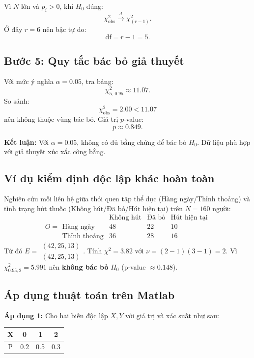 Vì $N$ lớn và $p_i > 0$, khi $H_0$ đúng:
\[
\chi^2_{\mathrm{obs}} \overset{d}{\longrightarrow} \chi^2_{(r-1)}.
\]
Ở đây $r = 6$ nên bậc tự do:
\[
\mathrm{df} = r - 1 = 5.
\]

\subsection*{Bước 5: Quy tắc bác bỏ giả thuyết}

Với mức ý nghĩa $\alpha = 0.05$, tra bảng:
\[
\chi^2_{5,\,0.95} \approx 11.07.
\]
So sánh:
\[
\chi^2_{\mathrm{obs}} = 2.00 < 11.07
\]
nên không thuộc vùng bác bỏ. Giá trị $p$-value:
\[
p \approx 0.849.
\]

\textbf{Kết luận:} Với $\alpha = 0.05$, không có đủ bằng chứng để bác bỏ $H_0$. Dữ liệu phù hợp với giả thuyết xúc xắc công bằng.

\subsection{Ví dụ kiểm định độc lập khác hoàn toàn}
Nghiên cứu mối liên hệ giữa thói quen tập thể dục (Hàng ngày/Thỉnh thoảng) và tình trạng hút thuốc (Không hút/Đã bỏ/Hút hiện tại) trên $N=160$ người:
\[
O=\begin{array}{c|ccc}
 & \text{Không hút} & \text{Đã bỏ} & \text{Hút hiện tại}\\\hline
\text{Hàng ngày} & 48 & 22 & 10\\
\text{Thỉnh thoảng} & 36 & 28 & 16
\end{array}
\]
Từ đó $E=\begin{smallmatrix}(42,25,13)\\(42,25,13)\end{smallmatrix}$. Tính $\chi^2=3.82$ với $\nu=(2-1)(3-1)=2$. Vì $\chi^2_{0.95,2}=5.991$ nên \textbf{không bác bỏ} $H_0$ (p-value $\approx0.148$).

\subsection{Áp dụng thuật toán trên Matlab}
\textbf{Áp dụng 1:} Cho hai biến độc lập $X,Y$ với giá trị và xác suất như sau:
\begin{table}[h!]
\centering
    \begin{tabular}{|c|ccc|}
    \hline
        X & 0 & 1 & 2  \\ \hline
        P & 0.2&0.5&0.3\\
        \hline
    \end{tabular}
    \label{tab:X_dist}
\end{table}

